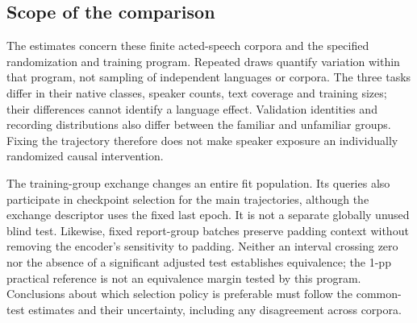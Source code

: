 \subsection{Scope of the comparison}
The estimates concern these finite acted-speech corpora and the specified randomization and training program. Repeated draws quantify variation within that program, not sampling of independent languages or corpora. The three tasks differ in their native classes, speaker counts, text coverage and training sizes; their differences cannot identify a language effect. Validation identities and recording distributions also differ between the familiar and unfamiliar groups. Fixing the trajectory therefore does not make speaker exposure an individually randomized causal intervention.

The training-group exchange changes an entire fit population. Its queries also participate in checkpoint selection for the main trajectories, although the exchange descriptor uses the fixed last epoch. It is not a separate globally unused blind test. Likewise, fixed report-group batches preserve padding context without removing the encoder's sensitivity to padding. Neither an interval crossing zero nor the absence of a significant adjusted test establishes equivalence; the 1-pp practical reference is not an equivalence margin tested by this program. Conclusions about which selection policy is preferable must follow the common-test estimates and their uncertainty, including any disagreement across corpora.
